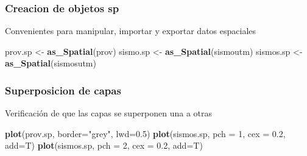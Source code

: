 \documentclass[11pt,]{article}
\newenvironment{Shaded}{\begin{snugshade}}{\end{snugshade}}
\newcommand{\KeywordTok}[1]{\textcolor[rgb]{0.13,0.29,0.53}{\textbf{#1}}}
\newcommand{\DataTypeTok}[1]{\textcolor[rgb]{0.13,0.29,0.53}{#1}}
\newcommand{\DecValTok}[1]{\textcolor[rgb]{0.00,0.00,0.81}{#1}}
\newcommand{\FloatTok}[1]{\textcolor[rgb]{0.00,0.00,0.81}{#1}}
\newcommand{\StringTok}[1]{\textcolor[rgb]{0.31,0.60,0.02}{#1}}
\newcommand{\OperatorTok}[1]{\textcolor[rgb]{0.81,0.36,0.00}{\textbf{#1}}}
\newcommand{\NormalTok}[1]{#1}
\begin{document}
\begin{Shaded}
\end{Shaded}

\subsubsection{Creacion de objetos sp}\label{creacion-de-objetos-sp}

Convenientes para manipular, importar y exportar datos espaciales

\begin{Shaded}
\begin{Highlighting}[]
\NormalTok{prov.sp <-}\StringTok{ }\KeywordTok{as_Spatial}\NormalTok{(prov)}
\NormalTok{sismo.sp <-}\StringTok{ }\KeywordTok{as_Spatial}\NormalTok{(sismoutm)}
\NormalTok{sismos.sp <-}\StringTok{ }\KeywordTok{as_Spatial}\NormalTok{(sismosutm)}
\end{Highlighting}
\end{Shaded}

\subsubsection{Superposicion de capas}\label{superposicion-de-capas}

Verificación de que las capas se superponen una a otras

\begin{Shaded}
\begin{Highlighting}[]
\KeywordTok{plot}\NormalTok{(prov.sp, }\DataTypeTok{border=}\StringTok{"grey"}\NormalTok{, }\DataTypeTok{lwd=}\FloatTok{0.5}\NormalTok{)}
\KeywordTok{plot}\NormalTok{(sismos.sp, }\DataTypeTok{pch =} \DecValTok{1}\NormalTok{, }\DataTypeTok{cex =} \FloatTok{0.2}\NormalTok{, }\DataTypeTok{add=}\NormalTok{T)}
\KeywordTok{plot}\NormalTok{(sismos.sp, }\DataTypeTok{pch =} \DecValTok{2}\NormalTok{, }\DataTypeTok{cex =} \FloatTok{0.2}\NormalTok{, }\DataTypeTok{add=}\NormalTok{T)}
\end{Highlighting}
\end{Shaded}
\end{document}
